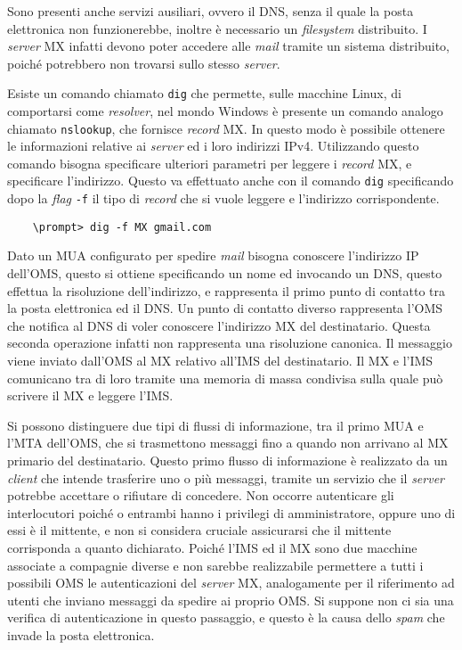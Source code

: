 \documentclass{article}
\numberwithin{equation}{subsection}
\begin{document}
Sono presenti anche servizi ausiliari, ovvero il \textcolor{Mahogany}{DNS}, senza il quale la posta elettronica non funzionerebbe, inoltre è necessario un \textit{filesystem} distribuito. I \textit{server} MX infatti devono poter accedere alle \textit{mail} tramite un sistema distribuito, poiché potrebbero non trovarsi sullo stesso \textit{server}. 

Esiste un comando chiamato \verb|dig| che permette, sulle macchine Linux, di comportarsi come \textit{resolver}, nel mondo Windows è presente un comando analogo chiamato \verb|nslookup|, che fornisce \textit{record} MX. In questo modo è possibile ottenere le informazioni relative ai \textit{server} ed i loro indirizzi \textcolor{BurntOrange}{IPv4}. Utilizzando questo comando bisogna specificare ulteriori parametri per leggere i \textit{record} MX, e specificare l'indirizzo. Questo va effettuato anche con il comando \verb|dig| specificando dopo la \textit{flag} \verb|-f| il tipo di \textit{record} che si vuole leggere e l'indirizzo corrispondente. 

\begin{verbatim}
    \prompt> dig -f MX gmail.com
\end{verbatim}


Dato un MUA configurato per spedire \textit{mail} bisogna conoscere l'indirizzo \textcolor{Bittersweet}{IP} dell'OMS, questo si ottiene specificando un nome ed invocando un \textcolor{Mahogany}{DNS}, questo effettua la risoluzione dell'indirizzo, e rappresenta il primo punto di contatto tra la posta elettronica ed il \textcolor{Mahogany}{DNS}. Un punto di contatto diverso rappresenta l'OMS che notifica al \textcolor{Mahogany}{DNS} di voler conoscere l'indirizzo MX del destinatario. Questa seconda operazione infatti non rappresenta una risoluzione canonica. Il messaggio viene inviato dall'OMS al MX relativo all'IMS del destinatario. 
Il MX e l'IMS comunicano tra di loro tramite una memoria di massa condivisa sulla quale può scrivere il MX e leggere l'IMS. 


Si possono distinguere due tipi di flussi di informazione, tra il primo MUA e l'MTA dell'OMS, che si trasmettono messaggi fino a quando non arrivano al MX primario del destinatario. 
Questo primo flusso di informazione è realizzato da un \textit{client} che intende trasferire uno o più messaggi, tramite un servizio che il \textit{server} potrebbe accettare o rifiutare di concedere. 
Non occorre autenticare gli interlocutori poiché o entrambi hanno i privilegi di amministratore, oppure uno di essi è il mittente, e non si considera cruciale assicurarsi che il mittente corrisponda a quanto dichiarato. Poiché l'IMS ed il MX sono due macchine associate a compagnie diverse e non sarebbe realizzabile permettere a tutti i possibili OMS le autenticazioni del \textit{server} MX, analogamente per il riferimento ad utenti che inviano messaggi da spedire ai proprio OMS. 
Si suppone non ci sia una verifica di autenticazione in questo passaggio, e questo è la causa dello \textit{spam} che invade la posta elettronica. 
\end{document}
